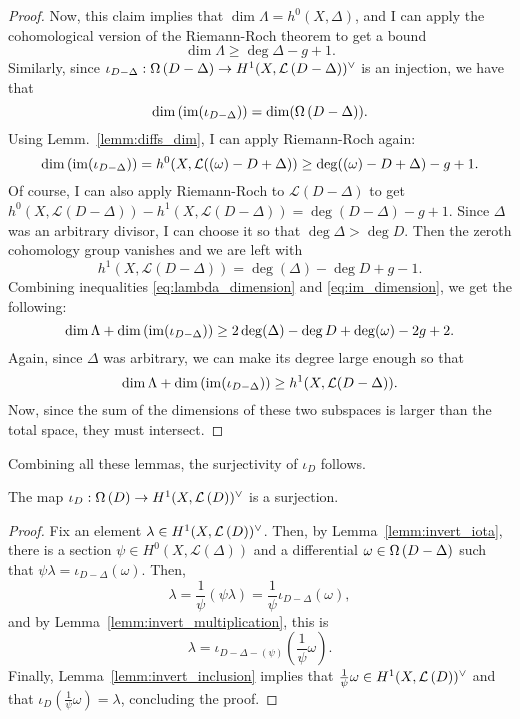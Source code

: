\begin{proof}
  Now, this claim implies that $\dim\Lambda=h^{0}(X,\Delta)$, and I can apply
  the cohomological version of the Riemann-Roch theorem to get a bound
  \begin{equation}\label{eq:lambda_dimension}
    \dim\Lambda\geq \deg{\Delta}-g+1.
  \end{equation}
  Similarly, since $\iota_{D-\Delta}:\Omega\left(D-\Delta\right)\to H^1(X,\mathcal{L}\left(D-\Delta\right))^{\vee}$
  is an injection, we have that
  \[
    \dim\left(\operatorname{im}(\iota_{D-\Delta})\right) =\dim(\Omega\left(D-\Delta\right)).
  \]
  Using Lemm.~\ref{lemm:diffs_dim}, I can apply Riemann-Roch again:
  \begin{equation}\label{eq:im_dimension}
    \dim\left(\operatorname{im}(\iota_{D-\Delta})\right)
    =h^{0}(X,\mathcal{L}((\omega)-D+\Delta))\geq \deg((\omega)-D+\Delta)-g+1.
  \end{equation}
  Of course, I can also apply Riemann-Roch to $\mathcal{L}(D-\Delta)$
  to get $h^{0}(X,\mathcal{L}(D-\Delta))-h^{1}(X,\mathcal{L}(D-\Delta))
  =\deg(D-\Delta)-g+1$. Since $\Delta$ was an arbitrary divisor, I can
  choose it so that $\deg\Delta >\deg D$. Then the zeroth cohomology
  group vanishes and we are left with
  \begin{equation}\label{eq:fst_dimension}
    h^{1}(X,\mathcal{L}(D-\Delta))=\deg(\Delta)-\deg D+g-1.
  \end{equation}
  Combining inequalities \eqref{eq:lambda_dimension} and
  \eqref{eq:im_dimension}, we get the following:
  \[
    \dim\Lambda+\dim\left(\operatorname{im}(\iota_{D-\Delta})\right)
    \geq 2\deg(\Delta)-\deg D+\deg(\omega)-2g+2.
  \]
  Again, since $\Delta$ was arbitrary, we can make its degree large enough
  so that
  \[
    \dim\Lambda+\dim\left(\operatorname{im}(\iota_{D-\Delta})\right)
    \geq h^{1}(X,\mathcal{L}(D-\Delta)).
  \]
  Now, since the sum of the dimensions of these two subspaces is larger
  than the total space, they must intersect.
\end{proof}
Combining all these lemmas, the surjectivity of $\iota_{D}$ follows.
\begin{prop}\label{prop:surjectivity}
  The map $\iota_{D}:\Omega\left(D\right)\to H^1(X,\mathcal{L}\left(D\right))^{\vee}$ is a surjection.
\end{prop}
\begin{proof}
  Fix an element $\lambda\in H^1(X,\mathcal{L}\left(D\right))^{\vee}$. Then, by Lemma~\ref{lemm:invert_iota},
  there is a section $\psi\in H^{0}(X,\mathcal{L}(\Delta))$ and a differential
  $\omega\in\Omega\left(D-\Delta\right)$ such that $\psi\lambda=\iota_{D-\Delta}(\omega)$.
  Then,
  \[\lambda=\frac1{\psi}(\psi\lambda)=\frac1{\psi}\iota_{D-\Delta}(\omega),\]
  and by Lemma~\ref{lemm:invert_multiplication}, this is
  \[\lambda=\iota_{D-\Delta-(\psi)}(\frac1{\psi}\omega).\]
  Finally, Lemma~\ref{lemm:invert_inclusion} implies that
  $\frac1{\psi}\omega\in H^1(X,\mathcal{L}\left(D\right))^{\vee}$ and that $\iota_{D}(\frac1{\psi}\omega)
  =\lambda$, concluding the proof.
\end{proof}

